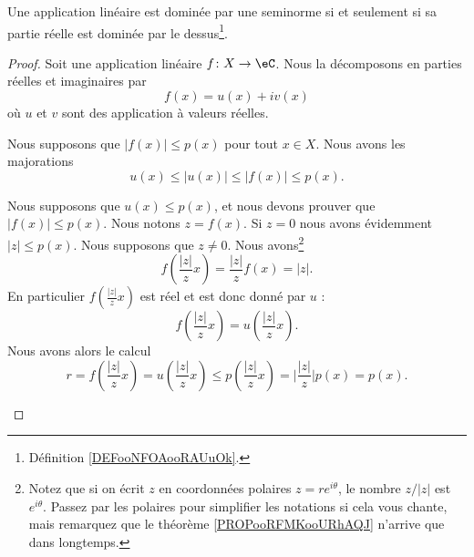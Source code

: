 \begin{lemma}
	Une application linéaire est dominée par une seminorme si et seulement si sa partie réelle est dominée par le dessus\footnote{Définition \ref{DEFooNFOAooRAUuOk}.}.
\end{lemma}

\begin{proof}
	Soit une application linéaire \(f \colon X\to \eC  \). Nous la décomposons en parties réelles et imaginaires par
	\begin{equation}
		f(x)=u(x)+iv(x)
	\end{equation}
	où \( u\) et \( v\) sont des application à valeurs réelles.

	\begin{subproof}
		\spitem[\( \Rightarrow\)]
		Nous supposons que \( | f(x) |\leq p(x)\) pour tout \( x\in X\). Nous avons les majorations
		\begin{equation}
			u(x)\leq | u(x) |\leq | f(x) |\leq p(x).
		\end{equation}

		\spitem[\( \Leftarrow\)]
		Nous supposons que \( u(x)\leq p(x)\), et nous devons prouver que \( | f(x) |\leq p(x)\). Nous notons \( z=f(x)\). Si \( z=0\) nous avons évidemment \( | z |\leq p(x)\). Nous supposons que \( z\neq 0\). Nous avons\footnote{Notez que si on écrit \( z\) en coordonnées polaires \( z=re^{i\theta}\), le nombre \( z/| z |\) est \( e^{i\theta}\). Passez par les polaires pour simplifier les notations si cela vous chante, mais remarquez que le théorème \ref{PROPooRFMKooURhAQJ} n'arrive que dans longtemps.}
		\begin{equation}
			f(\frac{ | z | }{ z }x)=\frac{ | z | }{ z }f(x)=| z |.
		\end{equation}
		En particulier \( f(\frac{ | z | }{ z }x)\) est réel et est donc donné par \( u\) :
		\begin{equation}
			f(\frac{ | z | }{ z }x)=u(\frac{ | z | }{ z }x).
		\end{equation}
		Nous avons alors le calcul
		\begin{equation}
			r=f(\frac{ | z | }{ z }x)=u(\frac{ | z | }{ z }x)\leq p(\frac{ | z | }{ z }x)=\big| \frac{ | z | }{ z }\big|p(x) =p(x).
		\end{equation}
	\end{subproof}
\end{proof}

